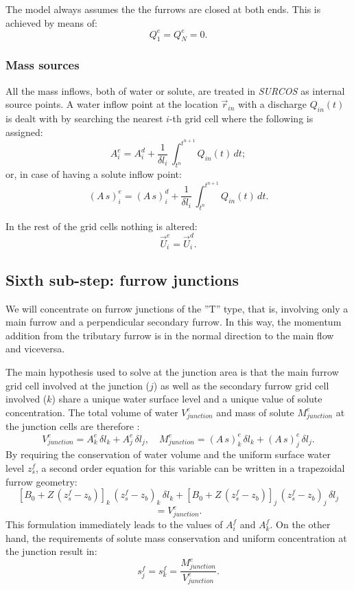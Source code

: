 \documentclass[review,authoryear]{elsarticle}
\newcommand{\eq}[2]{\begin{equation}\label{#2}#1\end{equation}}
\newcommand{\PA}[1] {\left(#1\right)}
\newcommand{\C}[1] {\left[#1\right]}
\begin{document}
The model always assumes the the furrows are closed at both
ends. This is achieved by means of:
\eq{Q_1^e=Q_N^e=0.}{EqInletOutlet}

\subsubsection{Mass sources}

All the mass inflows, both of water or solute, are treated in \emph{SURCOS} as
internal source points. A water inflow point at the location $\vec{r}_{in}$ with
a discharge $Q_{in}(t)$ is dealt with by searching the nearest $i$-th grid cell
where the following is assigned: 
\eq{A_i^e=A_i^d+\frac1{\delta l_i}\,\int_{t^n}^{t^{n+1}}Q_{in}(t)\,dt;}
{EqWaterInput}
or, in case of having a solute inflow point:
\eq
{(A\,s)_i^e=(A\,s)_i^d+\frac1{\delta l_i}\,\int_{t^n}^{t^{n+1}}Q_{in}(t)\,dt.}
{EqSoluteInput}

In the rest of the grid cells nothing is altered:
\eq{\vec{U}_i^e=\vec{U}_i^d.}{EqBoundaryPoint}

\subsection{Sixth sub-step: furrow junctions}

We will concentrate on furrow junctions of the ''T'' type, that is, involving
only a main furrow and a perpendicular secondary furrow. In this way, the
momentum addition from the tributary furrow is in the normal direction to the
main flow and viceversa.

The main hypothesis used to solve at the junction area is that the main
furrow grid cell involved at the junction ($j$) as well as the secondary furrow
grid cell involved ($k$) share a unique water surface level and a unique value
of solute concentration. The total volume of water $V_{junction}^e$ and mass of
solute $M_{junction}^e$ at the junction cells are therefore \citep{JaviSurcos1}:
\eq
{
	V_{junction}^e=A_k^e\,\delta l_k+A_j^e\,\delta l_j,\quad
	M_{junction}^e=(A\,s)_k^e\,\delta l_k+(A\,s)_j^e\,\delta l_j.
}{EqConfluenceMass}
By requiring the conservation of water volume and the uniform surface water
level $z_s^f$, a second order equation for this variable can be written in
a trapezoidal furrow geometry:
\[
	\C{B_0+Z\,\PA{z_s^f-z_b}}_k\,\PA{z_s^f-z_b}_k\,\delta l_k
	+\C{B_0+Z\,\PA{z_s^f-z_b}}_j\,\PA{z_s^f-z_b}_j\,\delta l_j
\]
\eq{=V_{junction}^e.}
{EqConfluencesWater}
This formulation immediately leads to the values of $A_i^f$ and $A_k^f$. On the
other hand, the requirements of solute mass conservation and uniform
concentration at the junction result in:
\eq{s_j^f=s_k^f=\frac{M_{junction}^e}{V_{junction}^e}.}{EqConfluencesSolute}
\end{document}
